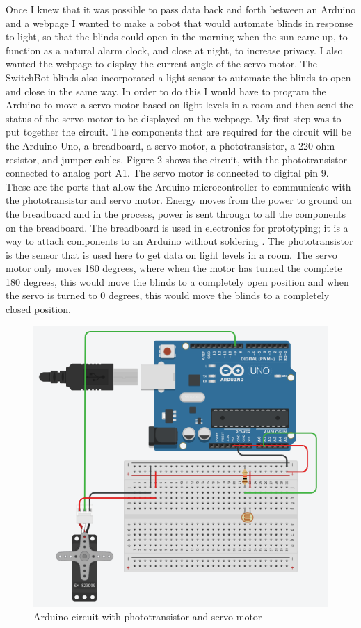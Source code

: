 \documentclass[10pt,twocolumn]{article}
\begin{document}
Once I knew that it was possible to pass data back and forth between an Arduino and a webpage I wanted to make a robot that would automate blinds in response to light, so that the blinds could open in the morning when the sun came up, to function as a natural alarm clock, and close at night, to increase privacy. I also wanted the webpage to display the current angle of the servo motor. The SwitchBot blinds also incorporated a light sensor to automate the blinds to  open and close in the same way. In order to do this I would have to program the Arduino to move a servo motor based on light levels in a room and then send the status of the servo motor to be displayed on the webpage. My first step was to put together the circuit. The components that are required for the circuit will be the Arduino Uno, a breadboard, a servo motor, a phototransistor, a 220-ohm resistor, and jumper cables. Figure 2 shows the circuit, with the phototransistor connected to analog port A1. The servo motor is connected to digital pin 9. These are the ports that allow the Arduino microcontroller to communicate with the phototransistor and servo motor. Energy moves from the power to ground on the breadboard and in the process, power is sent through to all the components on the breadboard. The breadboard is used in electronics for prototyping; it is a way to attach components to an Arduino without soldering \cite{Fiztgerald2015Arduino}. The phototransistor is the sensor that is used here to get data on light levels in a room. The servo motor only moves 180 degrees, where when the motor has turned the complete 180 degrees, this would move the blinds to a completely open position and when the servo is turned to 0 degrees, this would move the blinds to a completely closed position. 

\begin{figure}
    \centering
    \includegraphics[width=.95\linewidth]{Figure 2.png}
    \caption{
        Arduino circuit with phototransistor and servo motor
    }
    \label{fig:fig2}
\end{figure}
\end{document}
